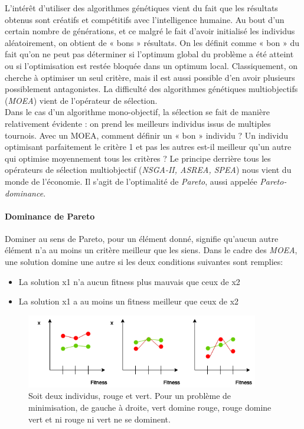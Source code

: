 \documentclass[12pt]{memoir}
\begin{document}
L'intérêt d'utiliser des algorithmes génétiques vient du fait que les résultats
obtenus sont créatifs et compétitifs avec l'intelligence humaine. Au
bout d'un certain nombre de générations, et ce malgré le fait d'avoir
initialisé les individus aléatoirement, on obtient de « bons »
résultats. On les définit comme « bon » du fait qu'on ne peut pas
déterminer si l'optimum global du problème a été atteint ou si
l'optimisation est restée bloquée dans un optimum local. Classiquement,
on cherche à optimiser un seul critère, mais il est aussi possible d'en
avoir plusieurs possiblement antagonistes. La difficulté des algorithmes génétiques multiobjectifs (\emph{MOEA}) vient de l'opérateur de
sélection. 
\\ Dans le cas d'un algorithme mono-objectif, la sélection se
fait de manière relativement évidente : on prend les meilleurs individus
issus de multiples tournois. Avec un MOEA, comment définir un « bon »
individu ? Un individu optimisant parfaitement le critère 1 et pas les
autres est-il meilleur qu'un autre qui optimise moyennement tous les
critères ? Le principe derrière tous les opérateurs de sélection
multiobjectif (\emph{NSGA-II\cite{deb2002fast}, ASREA\cite{sharma2010archived,sharma2010gpgpu}, SPEA}) nous vient du monde de
l'économie. Il s'agit de l'optimalité de \emph{Pareto}, aussi appelée
\emph{Pareto-dominance}.

\paragraph{Dominance de Pareto}\label{dominance-de-pareto}

Dominer au sens de Pareto\cite{voorneveld2003characterization}, pour un élément donné, signifie qu'aucun
autre élément n'a au moins un critère meilleur que les siens. Dans le
cadre des \emph{MOEA}, une solution domine une autre si les deux
conditions suivantes sont remplies:

\begin{itemize}
\item
  La solution x1 n'a aucun fitness plus mauvais que ceux de x2
\item
  La solution x1 a au moins un fitness meilleur que ceux de x2
\end{itemize}

\begin{figure}[htbp]
	\begin{center}
		\includegraphics[width=4in]{img/paretoDominance.png}
		\caption{Soit deux individus, rouge et vert. Pour un problème de minimisation, de gauche à droite, vert domine rouge, rouge domine vert et ni rouge ni vert ne se dominent.}
	\end{center}
\end{figure}
\end{document}
